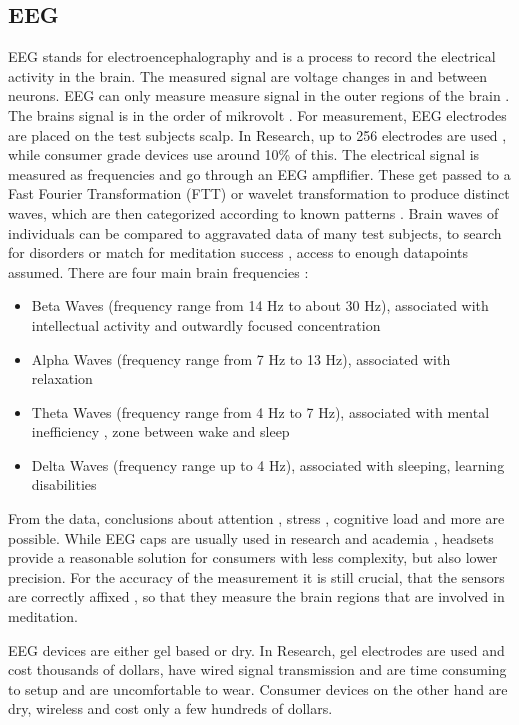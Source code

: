 \documentclass{llncs} %
\begin{document}
\subsection{EEG}
EEG stands for electroencephalography and is a process to record the electrical activity in the brain. The measured signal are voltage changes in and between neurons. EEG can only measure measure signal in the outer regions of the brain \cite{Sitaram}.
The brains signal is in the order of mikrovolt \cite{Berger}.  For measurement, EEG electrodes are placed on the test subjects scalp. In Research, up to 256 electrodes are used \cite{Seeck}, while consumer grade devices use around 10\% of this. \cite{Maskeliunas}
The electrical signal is measured as frequencies and go through an EEG ampflifier. These get passed to a Fast Fourier Transformation (FTT) or wavelet transformation \cite{Akin} to produce distinct waves, which are then categorized according to known patterns \cite{Shaker}.
Brain waves of individuals can be compared to aggravated data of many test subjects, to search for disorders \cite{Loo} or match for meditation success \cite{Tang:et al}, access to enough datapoints assumed.
There are four main brain frequencies \cite{Cahn}:
\begin{itemize}
    \item 
    Beta Waves (frequency range from 14 Hz to about 30 Hz), associated with intellectual activity and outwardly focused concentration
    \item 
    Alpha Waves (frequency range from 7 Hz to 13 Hz), associated with relaxation
    \item 
    Theta Waves (frequency range from 4 Hz to 7 Hz), associated with mental inefficiency \cite{Hammond}, zone between wake and sleep
    \item 
    Delta Waves (frequency range up to 4 Hz), associated with sleeping, learning disabilities \cite{Hammond}
\end{itemize}
From the data, conclusions about attention \cite{Berka}, stress \cite{Hosseini}, cognitive load \cite{Antonenko} and more are possible.
While EEG caps are usually used in research and academia \cite{Seeck}, headsets provide a reasonable solution for consumers with less complexity, but also lower precision\cite{Maskeliunas}.
For the accuracy of the measurement it is still crucial, that the sensors are correctly affixed \cite{Seeck}, so that they measure the brain regions that are involved in meditation.

EEG devices are either gel based or dry. In Research, gel electrodes are used and cost thousands of dollars, have wired signal transmission and are time consuming to setup and are uncomfortable to wear.
Consumer devices on the other hand are dry, wireless and cost only a few hundreds of dollars. \cite{Decho}
\end{document}
